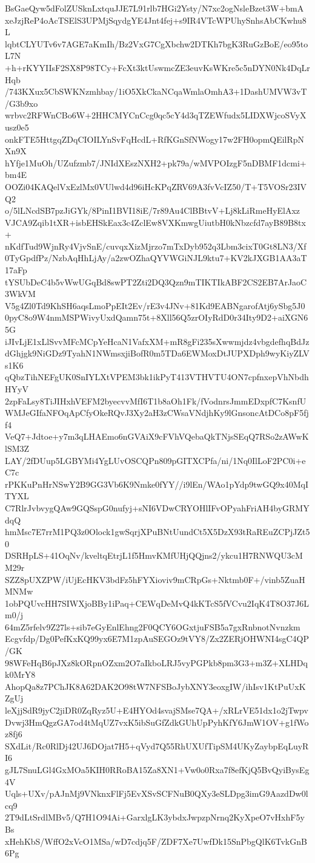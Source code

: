 BsGaeQyw5dFolZUSknLxtquJJE7L91rlb7HGi2Ysty/N7xc2ogNsleBzet3W+bmA
xeJzjReP4oAcTSElS3UPMjSqydgYE4Jnt4fej+s9IR4VTcWPUhySnhsAbCKwhu8L
lqbtCLYUTv6v7AGE7aKmIh/Bz2VxG7CgXbchw2DTKh7bgK3RuGzBoE/eo95toL7N
+h+rKYYIIsF2SX8P98TCy+FcXt3ktUswmcZE3euvKsWKre5c5nDYN0Nk4DqLrHqb
/743KXux5CbSWKNzmhbay/1iO5XkCkaNCqaWmlaOmhA3+1DashUMVW3vT/G3b9xo
wrbvc2RFWnCBo6W+2HHCMYCnCcg0qc5cY4d3qTZEWfudx5LIDXWjcoSVyXusz0e5
onkFTE5HttgqZDqCIOILYnSvFqHcdL+RfKGnSfNWogy17w2FH0opmQEilRpNXn9X
hYfje1MuOh/UZufzmb7/JNIdXEszNXH2+pk79a/wMVPOIzgF5nDBMF1dcmi+bm4E
OOZi04KAQelVxEzlMx0VUlwd4d96iHcKPqZRV69A3fvVcIZ50/T+T5VOSr23IVQ2
o/5lLNcdSB7pzJiGYk/8PinI1BVI18iE/7r89Au4ClBBtvV+Lj8kLiRmeHyElAxz
VJCA9Zqib1tXR+isbEHSkEax3c4ZclEw8VXKmwgUiutbH0kNbzcfd7ayB89B8tx+
nKdfTud9WjnRy4VjvSnE/cuvqxXizMjrzo7mTxDyb952q3Lbm3cixT0Gt8LN3/Xf
0TyGpdfPz/NzbAqHhLjAy/a2zwOZhaQYVWGiNJL9ktu7+KV2kJXGB1AA3aT17aFp
tYSUbDeC4b5vWwUGqBd8swPT2Zti2DQ3Qzn9mTIKTIkABF2CS2EB7ArJaoC3WkVM
V5g4Zl0Td9KhSH6aqsLmoPpEIt2Ev/rE3v4JNv+81Kd9EABNgarofAtj6ySbg5J0
0pyC8o9W4nmMSPWivyUxdQamn75t+8Xll56Q5zrOIyRdD0r34Ity9D2+aiXGN65G
iJIvLjE1xLlSvvMFcMCpYeHcaN1VafxXM+mR8gFi235sXwwmjdz4vbgdefhqBdJz
dGhjgk9NiGDz9TyahN1NWmsxjiBofR0m5TDa6EWMoxDtJUPXDph9wyKiyZLVs1K6
qQbzTihNEFgUK0SnIYLXtVPEM3bk1ikPyT413VTHVTU4ON7cpfnxepVhNbdhHYyV
2zpFaLsy8TiJIHxhVEFM2byecvvMfI6T1b8aOh1Fk/fVodnrsJmmEDxpfC7KsnfU
WMJeGIfaNFOqApCfyOkeRQvJ3Xy2aH3zCWsaVNdjhKy9lGnsoncAtDCo8pF5fjf4
VeQ7+Jdtoe+y7m3qLHAEmo6nGVAiX9cFVhVQebaQkTNjsSEqQ7RSo2zAWwKlSM3Z
LAY/2fDUup5LGBYMi4YgLUvOSCQPn809pGITXCPfa/ni/1Nq0IlLoF2PC0i+eC7c
rPKKuPnHrNSwY2B9GG3Vb6K9Nmke0fYY//i9lEn/WAo1pYdp9twGQ9x40MqITYXL
C7RlrJvbvygQAw9GQSspG0nufyj+sNI6VDwCRYOHlIFvOPyahFriAH4byGRMYdqQ
hmMsc7E7rrM1PQ3z0Olock1gwSqrjXPuBNtUundCt5X5DzX93tRaREuZCPjJZt50
DSRHpLS+41OqNv/kveltqEtrjL1f5HmvKMfUHjQQjns2/ykcu1H7RNWQU3cMM29r
SZZ8pUXZPW/iUjEcHKV3bdFz5hFYXioviv9mCRpGs+Nktmb0F+/vinb5ZuaHMNMw
1obPQUvcHH7SIWXjoBBy1iPaq+CEWqDeMvQ4kKTcS5fVCvu2IqK4T8O37J6Lm0/j
64mZ5rfelv9Z27ls+sib7eGyEnlEhng2F0QCY6OGxtjuFSB5a7gxRnbnotNvnzkm
Ecgvfdp/Dg0PefKxKQ99yx6E7M1zpAuSEGOz9tVY8/Zx2ZERjOHWNI4sgC4QP/GK
98WFeHqB6pJXz8kORpnOZxm2O7aIkboLRJ5vyPGPkb8pm3G3+m3Z+XLHDqk0MrY8
AhopQa8z7PChJK8A62DAK2O98tW7NFSBoJybXNY3eoxgIW/ihIsv1KtPuUxKZgUj
leXjjSdR9jyC2jiDR0ZqRyz5U+E4HYOd4svajSMse7QA+/xRLrVE51dx1o2jTwpv
Dvwj3HmQgzGA7od4tMqUZ7vxK5ibSuGfZdkGUhUpPyhKfY6JmW1OV+g1fWoz8fj6
SXdLit/Rc0RlDj42UJ6DOjat7H5+qVyd7Q55RhUXUfTipSM4UKyZaybpEqLuyRI6
gJL7SnuLGl4GxMOa5KIH0RRoBA15Za8XN1+Vw0o0Rxa7f8efKjQ5BvQyiBysEg4V
Uqls+UXv/pAJnMj9VNknxFlFj5EvXSvSCFNuB0QXy3eSLDpg3imG9AazdDw0lcq9
2T9dLtSrdlMBv5/Q7H1O94Ai+GarxlgLK3ybdxJwpzpNrnq2KyXpeO7vHxhF5yBs
xHehKbS/WffO2xVcO1MSa/wD7cdjq5F/ZDF7Xe7UwfDk15SnPbgQlK6TvkGnB6Pg
